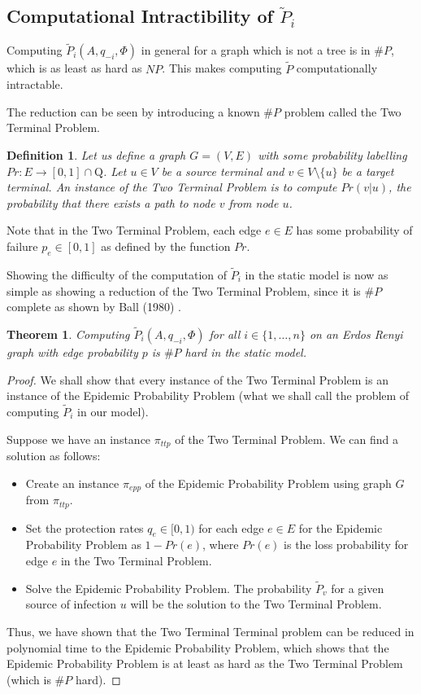 \documentclass{article}
\theoremstyle{plain}
\newtheorem{definition}{Definition}
\newtheorem{theorem}{Theorem}
\begin{document}
\subsection{Computational Intractibility of $\tilde{P}_i$}

Computing $\tilde{P}_i(A, q_{-i}, \Phi)$ in general for a graph which is not a tree is in $\# P$, which is as least as hard as $NP$. This makes computing $\tilde{P}$ computationally intractable.

The reduction can be seen by introducing a known $\# P$ problem called the Two Terminal Problem.

\begin{definition}
  Let us define a graph $G = (V, E)$ with some probability labelling $Pr: E \to [0,1] \cap \mathrm{Q}$. Let $u \in V$ be a source terminal and $v \in V \setminus \{u\}$ be a target terminal. An instance of the \emph{Two Terminal Problem} is to compute $Pr(v | u)$, the probability that there exists a path to node $v$ from node $u$.
\end{definition}

Note that in the Two Terminal Problem, each edge $e \in E$ has some probability of failure $p_e \in [0,1]$ as defined by the function $Pr$.

Showing the difficulty of the computation of $\tilde{P}_i$ in the static model is now as simple as showing a reduction of the Two Terminal Problem, since it is $\# P$ complete as shown by Ball (1980) \cite{ball80}.

\begin{theorem}
  Computing $\tilde{P}_i(A, q_{-i}, \Phi)$ for all $i \in \{1, \ldots, n\}$ on an Erdos Renyi graph with edge probability $p$ is $\# P$ hard in the static model.
\end{theorem}
\begin{proof}
  We shall show that every instance of the Two Terminal Problem is an instance of the Epidemic Probability Problem (what we shall call the problem of computing $\tilde{P}_i$ in our model).

  Suppose we have an instance $\pi_{ttp}$ of the Two Terminal Problem. We can find a solution as follows:
  \begin{itemize}
    \item Create an instance $\pi_{epp}$ of the Epidemic Probability Problem using graph $G$ from $\pi_{ttp}$.
    \item Set the protection rates $q_e \in [0,1)$ for each edge $e \in E$ for the Epidemic Probability Problem as $1 - Pr(e)$, where $Pr(e)$ is the loss probability for edge $e$ in the Two Terminal Problem.
    \item Solve the Epidemic Probability Problem. The probability $\tilde{P}_v$ for a given source of infection $u$ will be the solution to the Two Terminal Problem.
  \end{itemize}

  Thus, we have shown that the Two Terminal Terminal problem can be reduced in polynomial time to the Epidemic Probability Problem, which shows that the Epidemic Probability Problem is at least as hard as the Two Terminal Problem (which is $\# P$ hard).
\end{proof}
\end{document}
